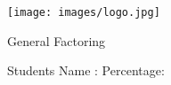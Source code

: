 \documentclass[12pt, a4paper]{exam}
\begin{document}
\vspace{7mm}
	\noindent
	\begin{minipage}[l]{.25\textwidth}
		\noindent
		\texttt{[image: images/logo.jpg]}
	{\large \begin{center}
\Large	
General Factoring


	\end{center} 
	}
	\end{minipage}
\hfill
\begin{minipage}[c]{0.75\textwidth} \large
  \hspace{.3cm}  Students Name :\hspace{6cm} Percentage:
	\begin{center}
\addpoints
{}
\gradetable[h][questions]
\noindent
	\end{center}
\end{minipage}
\vspace{0.14in}
\end{document}
